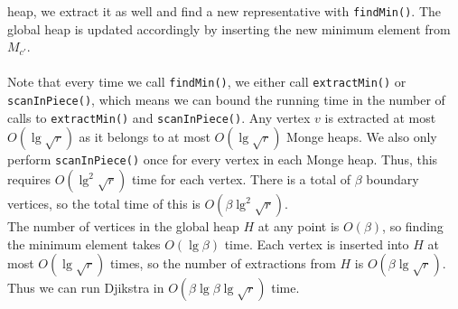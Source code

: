 heap, we extract it as well and find a new representative with \texttt{findMin()}. The
global heap is updated accordingly by inserting the new minimum element from $M_{c'}$. \\
\\
Note that every time we call \texttt{findMin()}, we either call \texttt{extractMin()} or
\texttt{scanInPiece()}, which means we can bound the running time in the number of calls to
\texttt{extractMin()} and \texttt{scanInPiece()}. Any vertex $v$ is extracted at most
$O(\lg \sqrt{r})$ as it belongs to at most $O(\lg \sqrt{r})$ Monge heaps. We also only
perform \texttt{scanInPiece()} once for every vertex in each Monge heap. Thus, this
requires $O(\lg^2 \sqrt{r})$ time for each vertex. There is a total of $\beta$ boundary
vertices, so the total time of this is $O(\beta\lg^2 \sqrt{r})$. \\
The number of vertices in the global heap $H$ at any point is $O(\beta)$, so finding the
minimum element takes $O(\lg \beta)$ time. Each vertex is inserted into $H$ at most $O(\lg
\sqrt{r})$ times, so the number of extractions from $H$ is $O(\beta\lg \sqrt{r})$. Thus we
can run Djikstra in $O(\beta\lg \beta\lg \sqrt{r})$ time.


